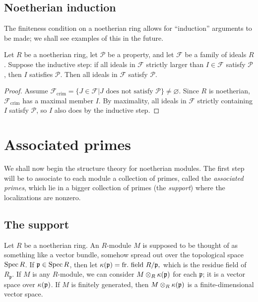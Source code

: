 \subsection{Noetherian induction}

The finiteness condition on a noetherian ring allows for ``induction''
arguments to be made; we shall see examples of this in the future.
\begin{proposition}
   Let $R$ be a noetherian ring, let $\mathcal{P}$ be a property, and let $\mathcal{F}$ be a family of
   ideals $R$. Suppose the inductive step: if all ideals in $\mathcal{F}$ strictly larger than
   $I\in \mathcal{F}$ satisfy $\mathcal{P}$, then $I$ satisfies $\mathcal{P}$. Then all ideals in
   $\mathcal{F}$ satisfy $\mathcal{P}$.
 \end{proposition}
 \begin{proof}
   Assume $\mathcal{F}_\text{crim} = \{J\in \mathcal{F}|J\text{ does not satisfy }\mathcal{P}\}\neq \varnothing$.
   Since $R$ is noetherian, $\mathcal{F}_\text{crim}$ has a maximal member $I$. By maximality, all
   ideals in $\mathcal{F}$ strictly containing $I$ satisfy $\mathcal{P}$, so $I$ also does by the inductive
   step.
 \end{proof}


\section{Associated primes}

We shall now begin the structure theory for noetherian modules. The first step
will be to associate to each module a collection of primes, called the
\emph{associated primes}, which lie in a bigger collection of primes (the
\emph{support}) where the
localizations are nonzero.

\subsection{The support}
 Let $R$ be a  noetherian ring.  An $R$-module $M$ is supposed to be thought
 of as something like a vector bundle, somehow
spread out over the topological space $\operatorname{Spec} R$. If $\mathfrak{p} \in \operatorname{Spec} R$, then  let
\( \kappa(\mathfrak{p}) = \mathrm{fr.  \ field \ } R/\mathfrak{p}  ,\)
which is the residue field of $R_{\mathfrak{p}}$. If $M$ is any $R$-module, we
can consider $M \otimes_R \kappa(\mathfrak{p})$ for each $\mathfrak{p}$; it is a
vector space over $\kappa(\mathfrak{p})$. If $M$ is finitely generated, then $M \otimes_R
\kappa(\mathfrak{p})$ is a finite-dimensional vector space.

